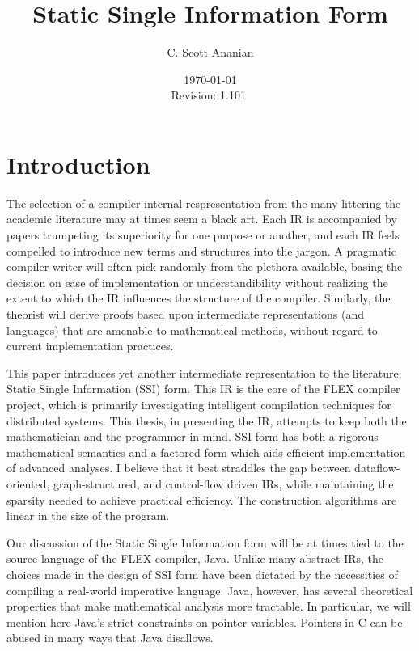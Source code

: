 \documentclass[12pt,titlepage,twoside]{article}
\title{Static Single Information Form
}
\author{C. Scott Ananian}
\date{\today \\ $ $Revision: 1.101 $ $}
\let\oldsection\section
\renewcommand{\section}{\setcounter{figure}{0}\setcounter{table}{0}\oldsection}
\begin{document}


\pagestyle{empty}
\maketitle\cleardoublepage
\pagestyle{myheadings}
\tableofcontents\listoffigures\listoftables\listofalgorithms\cleardoublepage
{}

\section{Introduction}
The selection of a compiler internal respresentation from the many
littering the academic literature may at times seem a black art.  Each
IR is accompanied by papers trumpeting its superiority for one purpose
or another, and each IR feels compelled to introduce new terms and
structures into the jargon.  A pragmatic compiler writer will often
pick randomly from the plethora available, basing the decision on ease
of implementation or understandibility without realizing the extent to
which the IR influences the structure of the compiler.  Similarly, the
theorist will derive proofs based upon intermediate representations
(and languages) that are amenable to mathematical methods, without
regard to current implementation practices.%

This paper introduces yet another intermediate
representation to the literature:  Static Single Information (SSI) form.
This IR is the core of the FLEX compiler project, which is primarily
investigating intelligent compilation techniques for distributed
systems.  This thesis, in presenting the IR,
attempts to keep both the mathematician and the programmer in mind.  
SSI form has both a rigorous mathematical semantics and a factored
form which aids efficient implementation of advanced analyses.
I believe that it best straddles the gap between dataflow-oriented,
graph-structured, and control-flow driven IRs, while maintaining the
sparsity needed to achieve practical efficiency.  The construction
algorithms are linear in the size of the program.

Our discussion of the Static Single Information form will be at times
tied to the source language of the FLEX compiler, Java.  Unlike many
abstract IRs, the choices made in the design of SSI form have been
dictated by the necessities of compiling a real-world imperative
language.  Java, however, has several theoretical properties that make
mathematical analysis more tractable.  In particular, we
will mention here Java's strict constraints on pointer variables.
Pointers in C can be abused in many ways that Java disallows.
\end{document}
